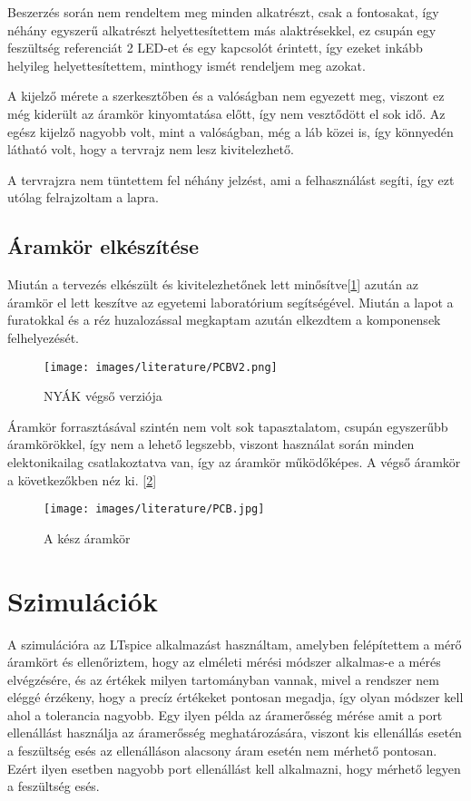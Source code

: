 Beszerzés során nem rendeltem meg minden alkatrészt, csak a fontosakat, így néhány
egyszerű alkatrészt helyettesítettem más alaktrésekkel, ez csupán egy feszültség referenciát
2 LED-et és egy kapcsolót érintett, így ezeket inkább helyileg helyettesítettem, minthogy
ismét rendeljem meg azokat.

A kijelző mérete a szerkesztőben és a valóságban nem egyezett meg, viszont ez még 
kiderült az áramkör kinyomtatása előtt, így nem vesztődött el sok idő. Az egész
kijelző nagyobb volt, mint a valóságban, még a láb közei is, így könnyedén látható
volt, hogy a tervrajz nem lesz kivitelezhető.

A tervrajzra nem tüntettem fel néhány jelzést, ami a felhasználást segíti, így ezt 
utólag felrajzoltam a lapra.

\subsection{Áramkör elkészítése}

Miután a tervezés elkészült és kivitelezhetőnek lett minősítve[\ref{fig:PCBV2}] azután az áramkör
el lett keszítve az egyetemi laboratórium segítségével. Miután a lapot a furatokkal és a réz
huzalozással megkaptam azután elkezdtem a komponensek felhelyezését.

\begin{figure}[h]
    \centering
    \texttt{[image: images/literature/PCBV2.png]}
    \caption{NYÁK végső verziója}
    \label{fig:PCBV2}
\end{figure}


Áramkör forrasztásával szintén nem volt sok tapasztalatom, csupán egyszerűbb
áramkörökkel, így nem a lehető legszebb, viszont használat során minden elektonikailag
csatlakoztatva van, így az áramkör működőképes. A végső áramkör a következőkben néz ki.
[\ref{fig:Aramkor}]


\begin{figure}[H]
    \centering
    \texttt{[image: images/literature/PCB.jpg]}
    \caption{A kész áramkör}
    \label{fig:Aramkor}
\end{figure}

\section{Szimulációk}

A szimulációra az LTspice \cite{LTspice} alkalmazást használtam, 
amelyben felépítettem a mérő áramkört és ellenőriztem, hogy az elméleti
mérési módszer alkalmas-e a mérés elvégzésére, és az értékek milyen
tartományban vannak, mivel a rendszer nem eléggé érzékeny, hogy a precíz
értékeket pontosan megadja, így olyan módszer kell ahol a tolerancia nagyobb.
Egy ilyen példa az áramerősség mérése amit a port ellenállást használja az
áramerősség meghatározására, viszont kis ellenállás esetén a
feszültség esés az ellenálláson alacsony áram esetén nem mérhető pontosan.
Ezért ilyen esetben nagyobb port ellenállást kell alkalmazni, hogy mérhető 
legyen a feszültség esés.

